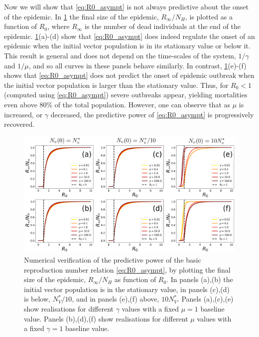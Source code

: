 Now we will show that \cref{eq:R0_asympt} is not always predictive about the
onset of the epidemic.
In \cref{fig:R0_check_stationary} the final size of the epidemic,
$R_{\infty}/N_H$, is plotted as a function of $R_0$, where $R_\infty$ is the
number of dead individuals at the end of the epidemic.
\cref{fig:R0_check_stationary}(a)-(d) show that \cref{eq:R0_asympt} does indeed
regulate the onset of an epidemic when the initial vector population is in its
stationary value or below it. This result is general and does not depend on the
time-scales of the system, $1/\gamma$ and $1/\mu$, and so all curves in these
panels behave similarly. In contrast, \cref{fig:R0_check_stationary}(e)-(f)
shows that \cref{eq:R0_asympt} does not predict the onset of epidemic outbreak
when the initial vector population is larger than the stationary value. Thus,
for $R_0<1$ (computed using  \cref{eq:R0_asympt}) severe outbreaks appear,
yielding mortalities even above 80\% of the total population. However, one can
observe that  as $\mu$ is increased, or $\gamma$ decreased, the predictive
power of \cref{eq:R0_asympt} is progressively recovered.

\begin{figure}[t!]
    \centering
    \includegraphics[width=\textwidth]{Figures/R0_check_stationary.pdf}
    \caption[
        Numerical verification of the predictive power of the
        stationary basic reproduction number
    ]{Numerical verification of the predictive	power of the basic
        reproduction number relation \cref{eq:R0_asympt}, by plotting the final
        size of
        the epidemic, $R_\infty/N_H$ as function of $R_0$. In panels (a),(b)
        the
        initial vector population is in the stationary value, in panels (c),(d)
        is
        below, $N_V^*/10$, and in panels (e),(f) above, $10 N_V^*$. Panels
        (a),(c),(e)
        show realisations for different $\gamma$ values with a fixed $\mu=1$
        baseline
        value. Panels (b),(d),(f) show realisations for different $\mu$ values
        with a
        fixed $\gamma=1$ baseline value.}
    \label{fig:R0_check_stationary}
\end{figure}

